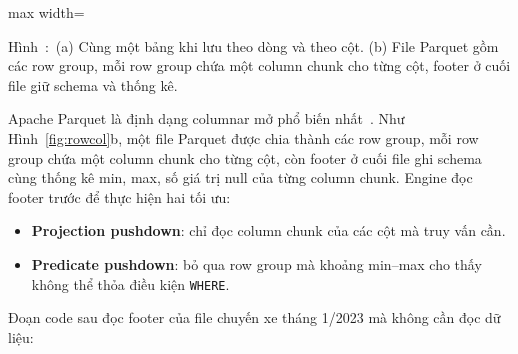 \documentclass[12pt]{article}
\newcounter{hinh}
\newcommand{\capfig}[1]{%
  \refstepcounter{hinh}%
    Hình~\thehinh:~#1
}
\newenvironment{figblock}{\par\medskip\noindent\begin{minipage}{\linewidth}}{\end{minipage}\par\medskip}
\newcommand{\figcap}[2]{%
  \begin{figurecaptionmodern}\capfig{#1}\label{#2}\end{figurecaptionmodern}}
\begin{document}
\begin{figblock}
\begin{center}
\vspace{0.6em}
\begin{adjustbox}{max width=\linewidth}
\end{adjustbox}
\end{center}
\figcap{(a) Cùng một bảng khi lưu theo dòng và theo cột. (b) File Parquet gồm các row group, mỗi row group chứa một column chunk cho từng cột, footer ở cuối file giữ schema và thống kê.}{fig:rowcol}
\end{figblock}

Apache Parquet là định dạng columnar mở phổ biến nhất~\cite{parquet2026format}. Như Hình~\ref{fig:rowcol}b, một file Parquet được chia thành các row group, mỗi row group chứa một column chunk cho từng cột, còn footer ở cuối file ghi schema cùng thống kê min, max, số giá trị null của từng column chunk. Engine đọc footer trước để thực hiện hai tối ưu:

\begin{itemize}
    \item \textbf{Projection pushdown}: chỉ đọc column chunk của các cột mà truy vấn cần.
    \item \textbf{Predicate pushdown}: bỏ qua row group mà khoảng min--max cho thấy không thể thỏa điều kiện \texttt{WHERE}.
\end{itemize}

Đoạn code sau đọc footer của file chuyến xe tháng 1/2023 mà không cần đọc dữ liệu:
\end{document}
